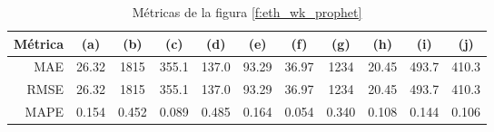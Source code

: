 \documentclass[a4paper,10pt]{article}
\begin{document}
\begin{table}[h!]
 \begin{center}
  \begin{tabular}{|r|c|c|c|c|c|c|c|c|c|c|}
    Métrica & (a) & (b) & (c) & (d) & (e) & (f) & (g) & (h) & (i) & (j) \\ \hline
    MAE & 26.32 & 1815 & 355.1 & 137.0 & 93.29 & 36.97& 1234& 20.45 & 493.7 & 410.3 \\
    RMSE & 26.32 & 1815 & 355.1 & 137.0 & 93.29 & 36.97& 1234& 20.45 & 493.7 & 410.3 \\
    MAPE & 0.154 & 0.452 & 0.089 & 0.485 & 0.164 & 0.054 & 0.340 & 0.108 & 0.144 & 0.106 \\ \hline
  \end{tabular}
  \caption{Métricas de la figura \ref{f:eth_wk_prophet}}
  \label{tab:eth_prophet_wk}
 \end{center}
\end{table}
\end{document}
